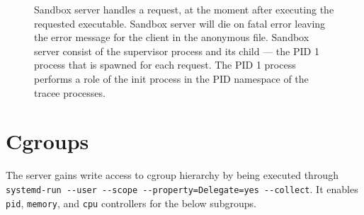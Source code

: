 \documentclass[en]{pracamgr}
\begin{document}
\begin{figure}[h]
\caption{Sandbox server handles a request, at the moment after executing the requested executable. Sandbox server will die on fatal error leaving the error message for the client in the anonymous file. Sandbox server consist of the supervisor process and its child --- the PID 1 process that is spawned for each request. The PID 1 process performs a role of the init process in the PID namespace of the tracee processes.}
\label{fig:server_handles_request_after_execve}
\end{figure}

\section{Cgroups}

The server gains write access to cgroup hierarchy by being executed through \texttt{systemd-run -{}-user -{}-scope -{}-property=Delegate=yes -{}-collect}. It enables \texttt{pid}, \texttt{memory}, and \texttt{cpu} controllers for the below subgroups.
\end{document}
